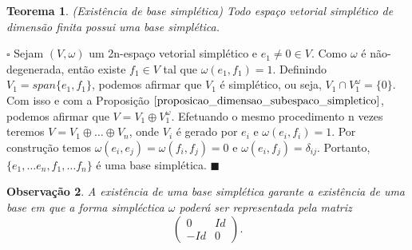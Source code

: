 \documentclass[12pt]{book}
\newtheorem{teorema}{Teorema}[section]
\newtheorem{observacao}[teorema]{Observação}
\newenvironment{prova}[1]{$\square$ #1}{\hfill$\blacksquare$}
\begin{document}
	\begin{teorema}\label{teorema_existencia_base_simpletica}
		(Existência de base simplética) Todo espaço vetorial simplético de dimensão finita possui uma base simplética.
	\end{teorema}
	\begin{prova}
		Sejam $(V, \omega)$ um 2n-espaço vetorial simplético e $e_{1} \neq 0\in V$. Como $\omega$ é não-degenerada, então existe $f_{1} \in V$ tal que $\omega(e_{1}, f_{1}) = 1$. Definindo $V_{1} = span\{e_{1}, f_{1}\}$, podemos afirmar que $V_{1}$ é simplético, ou seja, $V_{1}\cap V_{1}^{\omega} = \{0\}$. Com isso e com a Proposição $\ref{proposicao_dimensao_subespaco_simpletico}$, podemos afirmar que $V = V_{1}\oplus V_{1}^{\omega}$. Efetuando o mesmo procedimento n vezes teremos $V = V_{1}\oplus \dots \oplus V_{n}$, onde $V_{i}$ é gerado por $e_{i}$ e $\omega(e_{i}, f_{i}) = 1$. Por construção temos $\omega(e_{i}, e_{j})=\omega(f_{i}, f_{j}) =0$ e $\omega(e_{i}, f_{j}) = \delta_{ij}$. Portanto, $\{e_{1}, \dots e_{n}, f_{1}, \dots f_{n}\}$ é uma base simplética.
	\end{prova}
	
	\begin{observacao}\label{observacao_existencia_base_simpletica}
		A existência de uma base simplética garante a existência de uma base em que a forma simpléctica $\omega$ poderá ser representada pela matriz
		$$
		\left(
		\begin{array}{cc}
		0 & Id
		\\
		-Id & 0
		\end{array}
		\right).
		$$
	\end{observacao}
	
\end{document}
